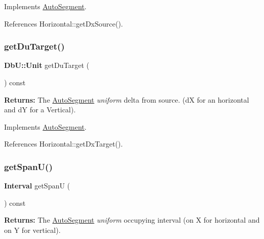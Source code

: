 Implements \hyperlink{classKatabatic_1_1AutoSegment_ab4881df67bd8f036d0199ed6540fe774}{Auto\+Segment}.



References Horizontal\+::get\+Dx\+Source().

\mbox{\label{classKatabatic_1_1AutoHorizontal_a76e349c14c904b3300a15caa1ee8b680}} 
\subsubsection{\texorpdfstring{get\+Du\+Target()}{getDuTarget()}}
{\footnotesize\ttfamily \textbf{ Db\+U\+::\+Unit} get\+Du\+Target (\begin{DoxyParamCaption}{ }\end{DoxyParamCaption}) const\hspace{0.3cm}{\ttfamily [virtual]}}

{\bfseries Returns\+:} The \hyperlink{classKatabatic_1_1AutoSegment}{Auto\+Segment} {\itshape uniform} delta from source. (dX for an horizontal and dY for a Vertical). 

Implements \hyperlink{classKatabatic_1_1AutoSegment_a0644d656eedc71dba2fb3c6c0d83ed3f}{Auto\+Segment}.



References Horizontal\+::get\+Dx\+Target().

\mbox{\label{classKatabatic_1_1AutoHorizontal_a0b5ac47ab175815e1a9bc07f2517614a}} 
\subsubsection{\texorpdfstring{get\+Span\+U()}{getSpanU()}}
{\footnotesize\ttfamily \textbf{ Interval} get\+SpanU (\begin{DoxyParamCaption}{ }\end{DoxyParamCaption}) const\hspace{0.3cm}{\ttfamily [virtual]}}

{\bfseries Returns\+:} The \hyperlink{classKatabatic_1_1AutoSegment}{Auto\+Segment} {\itshape uniform} occupying interval (on X for horizontal and on Y for vertical). 

